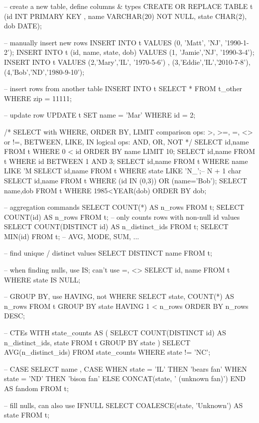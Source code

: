 \begin{SQLcode}
-- create a new table, define columns & types
CREATE OR REPLACE TABLE t (id INT PRIMARY KEY
	, name VARCHAR(20) NOT NULL, state CHAR(2), dob DATE);

-- manually insert new rows
INSERT INTO t VALUES (0, 'Matt', 'NJ', '1990-1-2');
INSERT INTO t (id, name, state, dob) VALUES
                     (1, 'Jamie','NJ', '1990-3-4');
INSERT INTO t VALUES (2,'Mary','IL', '1970-5-6')
	, (3,'Eddie','IL','2010-7-8'),(4,'Bob','ND','1980-9-10');

-- insert rows from another table
INSERT INTO t SELECT * FROM t_other WHERE zip = 11111;

-- update row
UPDATE t SET name = 'Mar' WHERE id = 2;

/* SELECT with WHERE, ORDER BY, LIMIT
comparison ops: >, >=, =, <> or !=, BETWEEN, LIKE, IN
logical ops: AND, OR, NOT */
SELECT id,name FROM t WHERE 0 < id ORDER BY name LIMIT 10;
SELECT id,name FROM t WHERE id BETWEEN 1 AND 3;
SELECT id,name FROM t WHERE name LIKE 'M%
SELECT id,name FROM t WHERE state LIKE 'N_';-- N + 1 char
SELECT id,name FROM t WHERE (id IN (0,3)) OR (name='Bob');
SELECT name,dob FROM t WHERE 1985<YEAR(dob) ORDER BY dob;

-- aggregation commands
SELECT COUNT(*) AS n_rows FROM t;
SELECT COUNT(id) AS n_rows FROM t; -- only counts rows with non-null id values
SELECT COUNT(DISTINCT id) AS n_distinct_ids FROM t;
SELECT MIN(id) FROM t; -- AVG, MODE, SUM, ...

-- find unique / distinct values
SELECT DISTINCT name FROM t;

-- when finding nulls, use IS; can't use =, <>
SELECT id, name FROM t WHERE state IS NULL;

-- GROUP BY, use HAVING, not WHERE
SELECT state, COUNT(*) AS n_rows
FROM t
GROUP BY state
HAVING 1 < n_rows
ORDER BY n_rows DESC;

-- CTEs
WITH state_counts AS (
	SELECT COUNT(DISTINCT id) AS n_distinct_ids, state
	FROM t GROUP BY state
)
SELECT AVG(n_distinct_ids)
FROM state_counts WHERE state != 'NC';

-- CASE
SELECT name
	, CASE
		WHEN state = 'IL' THEN 'bears fan'
		WHEN state = 'ND' THEN 'bison fan'
		ELSE CONCAT(state, ' (unknown fan)')
	END AS fandom
FROM t;

-- fill nulls, can also use IFNULL
SELECT COALESCE(state, 'Unknown') AS state FROM t;


\end{SQLcode}
